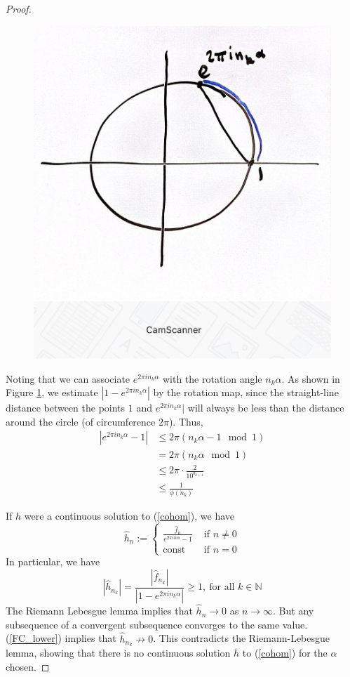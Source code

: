 \documentclass[12pt, reqno]{amsart}
\theoremstyle{definition}
\theoremstyle{remark}
\begin{document}
\begin{itemize}
\begin{proof}
\begin{figure}[H]\label{geom_arg}
    \includegraphics*[width=5in]{Long image 2024-04-15 21.06.54.jpg}
\end{figure}


Noting that we can associate $e^{2\pi in_{k}\alpha}$ with the rotation angle $n_{k}\alpha$. As shown in Figure \ref{geom_arg}, we estimate $|1-e^{2\pi in_{k}\alpha}|$ by the rotation map, since the straight-line distance between the points $1$ and $e^{2\pi in_{k}\alpha}|$ will always be less than the distance around the circle (of circumference $2\pi$). Thus, 
\begin{align*}
|e^{2\pi in_{k} \alpha}-1|&\le  2\pi (n_{k} \alpha-1\mod1)\\
&= 2\pi(n_{k}\alpha\mod1)\\
&\le 2\pi\cdot \frac{2}{10^{b_{k+1}}}\\
&\le \frac{1}{\phi(n_{k})}
\end{align*}

If $h$ were a continuous solution to (\ref{cohom}), we have 
\[
\hat h_{n}:=
\begin{cases} \frac{\hat f_{n}}{e^{2\pi in \alpha}-1} & \text{ if }n\ne0\\
\text{const} & \text{ if }n=0
\end{cases}
\]
In particular, we have 
\begin{equation} \label{FC_lower}
|\hat h_{n_{k}}|= \frac{\left|\hat f_{n_{k}}\right|}{|1-e^{2\pi in_{k}\alpha}|}\ge 1,~\text{for all }k\in \mathbb{N}
\end{equation}
The Riemann Lebesgue lemma implies that $\hat h_{n}\rightarrow 0$ as $n \rightarrow \infty$. But any subsequence of a convergent subsequence converges to the same value. (\ref{FC_lower}) implies that $\hat h_{n_{k}}\not\to0$. This contradicts the Riemann-Lebesgue lemma, showing that there is no continuous solution $h$ to (\ref{cohom}) for the $\alpha$ chosen.


\end{proof}
\end{itemize}
\end{document}
